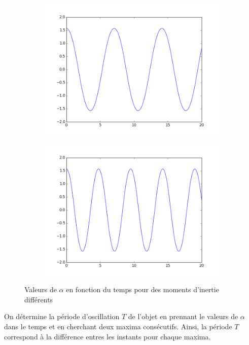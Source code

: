 \documentclass[10pt]{article}
\begin{document}
\begin{figure}[h]
 \centering
 \begin{subfigure}{0.4\textwidth}
  \includegraphics[width=\textwidth]{../fig/alpha1.png}
 \end{subfigure}
 \begin{subfigure}{0.4\textwidth}
  \includegraphics[width=\textwidth]{../fig/alpha2.png}

 \end{subfigure}
 \caption{Valeurs de $\alpha$ en fonction du temps pour des moments d'inertie différents}

\end{figure}
 \pagebreak
 On détermine la période d'oscillation $T$ de l'objet en prennant le valeurs de $\alpha$ dans le temps et en cherchant deux maxima consécutifs.
 Ainsi, la période $T$ correspond à la différence entres les instants pour chaque maxima.
\end{document}
